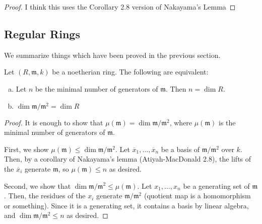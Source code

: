 \begin{proof}

  I think this uses the Corollary 2.8 version of Nakayama's Lemma
\end{proof}

\subsection{Regular Rings}

We summarize things which have been proved in the previous section.


\begin{proposition} \label{prop:regular_def_equiv}
	Let \((R,\mathfrak{m},k)\) be a noetherian ring. 
	The following are equivalent:
	\begin{enumerate}[(a)]
		\item Let \(n\) be the minimal number of generators of
			\(\mathfrak{m}\).
			Then \(n = \dim R\).
		\item \(\dim \mathfrak{m} / \mathfrak{m}^{2}  = \dim R\)
	\end{enumerate}
\end{proposition}

\begin{proof}
	It is enough to show that 
	\(\mu(\mathfrak{m}) = \dim \mathfrak{m} / \mathfrak{m}^{2}\),
	where \(\mu(\mathfrak{m})\) is the minimal number of generators
	of \(\mathfrak{m}\).
	
	First, we show \(\mu(\mathfrak{m}) \leq \dim \mathfrak{m} / \mathfrak{m}^{2}\).
	Let \(\overline{x}_{1}, \ldots, \overline{x}_{n}\) 
	be a basis of \(\mathfrak{m} / \mathfrak{m}^{2}\) 
	over \(k\).
	Then, by a corollary of Nakayama's lemma (Atiyah-MacDonald 2.8),
	the lifts of the \(\overline{x}_{i}\) generate \(\mathfrak{m}\),
	so \(\mu(\mathfrak{m}) \leq n\) as desired.

	Second, we show that 
	\(\dim \mathfrak{m} / \mathfrak{m}^{2} \leq \mu(\mathfrak{m})\).
	Let \(x_{1}, \ldots, x_{n}\) be a generating set of 
	\(\mathfrak{m}\).
	Then, the residues of the \(x_{i}\) generate 
	\(\mathfrak{m} / \mathfrak{m}^{2}\) (quotient map is a 
	homomorphism or something).
	Since it is a generating set, it contains a basis by
	linear algebra, and
	\(\dim \mathfrak{m} / \mathfrak{m}^{2} \leq n\) as desired.
\end{proof}

